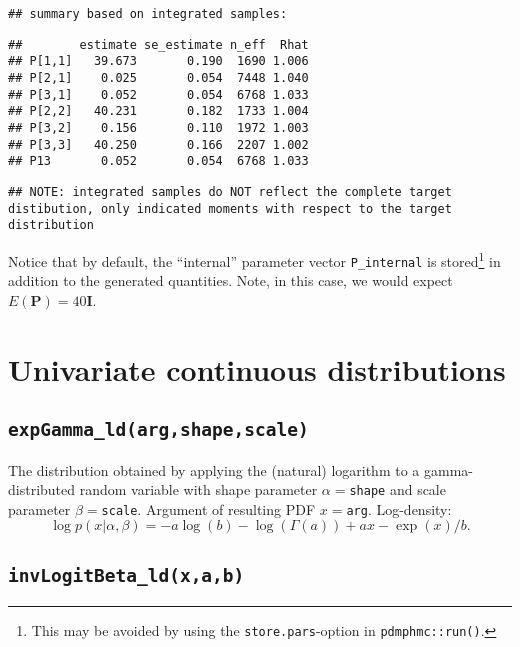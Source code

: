 \documentclass[
]{book}
\begin{document}
\begin{verbatim}
## summary based on integrated samples:
\end{verbatim}

\begin{verbatim}
##        estimate se_estimate n_eff  Rhat
## P[1,1]   39.673       0.190  1690 1.006
## P[2,1]    0.025       0.054  7448 1.040
## P[3,1]    0.052       0.054  6768 1.033
## P[2,2]   40.231       0.182  1733 1.004
## P[3,2]    0.156       0.110  1972 1.003
## P[3,3]   40.250       0.166  2207 1.002
## P13       0.052       0.054  6768 1.033
\end{verbatim}

\begin{verbatim}
## NOTE: integrated samples do NOT reflect the complete target distibution, only indicated moments with respect to the target distribution
\end{verbatim}

Notice that by default, the ``internal'' parameter vector \texttt{P\_internal} is stored\footnote{This may be avoided by using the \texttt{store.pars}-option in \texttt{pdmphmc::run()}.} in addition to the generated quantities. Note, in this case, we would expect \(E(\mathbf P)=40 \mathbf I\).

\hypertarget{univariate-continuous-distributions}{%
\section{Univariate continuous distributions}\label{univariate-continuous-distributions}}

\hypertarget{expgamma_ldargshapescale}{%
\subsection{\texorpdfstring{\texttt{expGamma\_ld(arg,shape,scale)}}{expGamma\_ld(arg,shape,scale)}}\label{expgamma_ldargshapescale}}

The distribution obtained by applying the (natural) logarithm to a gamma-distributed random variable with shape parameter \(\alpha=\)\texttt{shape} and scale parameter \(\beta=\)\texttt{scale}. Argument of resulting PDF \(x=\)\texttt{arg}. Log-density:
\[
\log p(x|\alpha,\beta) = -a\log(b) - \log(\Gamma(a)) + ax - \exp(x)/b.
\]

\hypertarget{invlogitbeta_ldxab}{%
\subsection{\texorpdfstring{\texttt{invLogitBeta\_ld(x,a,b)}}{invLogitBeta\_ld(x,a,b)}}\label{invlogitbeta_ldxab}}
\end{document}
